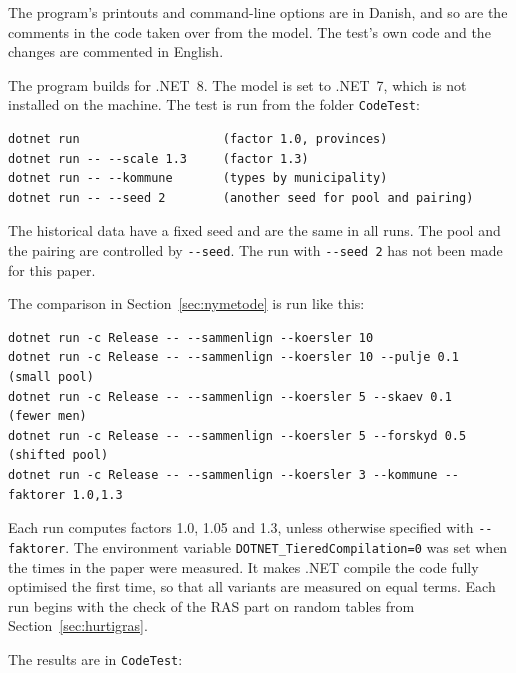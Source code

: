 \documentclass[12pt,a4paper]{article}
\newcommand{\kode}[1]{\texttt{#1}}
\begin{document}
The program's printouts and command-line options are in Danish, and so are the comments in the
code taken over from the model. The test's own code and the changes are commented in English.

The program builds for .NET~8. The model is set to .NET~7, which is not installed on the machine.
The test is run from the folder \kode{CodeTest}:

{\small
\begin{verbatim}
dotnet run                    (factor 1.0, provinces)
dotnet run -- --scale 1.3     (factor 1.3)
dotnet run -- --kommune       (types by municipality)
dotnet run -- --seed 2        (another seed for pool and pairing)
\end{verbatim}
}

The historical data have a fixed seed and are the same in all runs. The pool and the pairing are
controlled by \kode{-{}-seed}. The run with \kode{-{}-seed 2} has not been made for this paper.

The comparison in Section~\ref{sec:nymetode} is run like this:

{\small
\begin{verbatim}
dotnet run -c Release -- --sammenlign --koersler 10
dotnet run -c Release -- --sammenlign --koersler 10 --pulje 0.1    (small pool)
dotnet run -c Release -- --sammenlign --koersler 5 --skaev 0.1     (fewer men)
dotnet run -c Release -- --sammenlign --koersler 5 --forskyd 0.5   (shifted pool)
dotnet run -c Release -- --sammenlign --koersler 3 --kommune --faktorer 1.0,1.3
\end{verbatim}
}

Each run computes factors 1.0, 1.05 and 1.3, unless otherwise specified with \kode{-{}-faktorer}.
The environment variable \kode{DOTNET\_TieredCompilation=0} was set when the times in the paper
were measured. It makes .NET compile the code fully optimised the first time,
so that all variants are measured on equal terms. Each run begins with the check of the RAS part on
random tables from Section~\ref{sec:hurtigras}.

The results are in \kode{CodeTest}:
\end{document}
